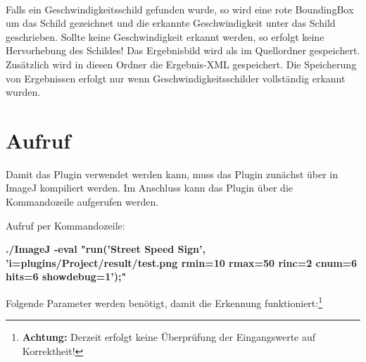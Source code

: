 \paragraph*{}
Falls ein Geschwindigkeitsschild gefunden wurde, so wird eine rote BoundingBox um das Schild gezeichnet und die erkannte Geschwindigkeit unter das Schild geschrieben.
Sollte keine Geschwindigkeit erkannt werden, so erfolgt keine Hervorhebung des Schildes!
Das Ergebnisbild wird als  im Quellordner gespeichert.
Zusätzlich wird in diesen Ordner die Ergebnis-XML gespeichert.
Die Speicherung von Ergebnissen erfolgt nur wenn Geschwindigkeitsschilder vollständig erkannt wurden.

\section{Aufruf}
Damit das Plugin verwendet werden kann, muss das Plugin zunächst über  in ImageJ kompiliert werden.
Im Anschluss kann das Plugin über die Kommandozeile aufgerufen werden.

Aufruf per Kommandozeile:

\begin{small}
\textbf{./ImageJ -eval "run('Street Speed Sign', 'i=plugins/Project/result/test.png rmin=10 rmax=50 rinc=2 cnum=6 hits=6 showdebug=1');"}
\end{small}

\pagebreak
Folgende Parameter werden benötigt, damit die Erkennung funktioniert:\footnote{\textbf{Achtung:} Derzeit erfolgt keine Überprüfung der Eingangswerte auf Korrektheit!}


